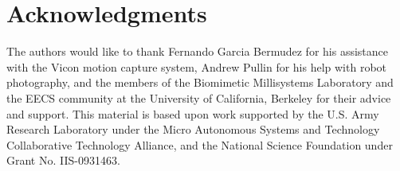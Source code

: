 \documentclass{aamas2013}
\begin{document}
\section{Acknowledgments}
The authors would like to thank Fernando Garcia Bermudez for his 
assistance with the Vicon motion capture system, Andrew Pullin for his 
help with robot photography, and the members of the Biomimetic 
Millisystems Laboratory and the EECS community at the University of 
California, Berkeley for their advice and support. This material is based upon 
work supported by the U.S. Army Research Laboratory under the Micro Autonomous 
Systems and Technology Collaborative Technology Alliance, and the National 
Science Foundation under Grant No. IIS-0931463.





\end{document}
